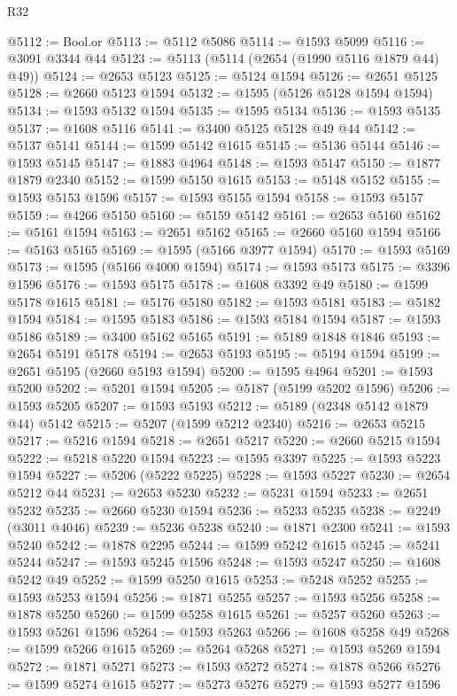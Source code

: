 \begin{lexlean}{R32}
\begin{coremodule}
@5112 := Bool.or
@5113 := @5112 @5086
@5114 := @1593 @5099
@5116 := @3091 @3344 @44
@5123 := @5113 (@5114 (@2654 (@1990 @5116 @1879 @44) @49))
@5124 := @2653 @5123
@5125 := @5124 @1594
@5126 := @2651 @5125
@5128 := @2660 @5123 @1594
@5132 := @1595 (@5126 @5128 @1594 @1594)
@5134 := @1593 @5132 @1594
@5135 := @1595 @5134
@5136 := @1593 @5135
@5137 := @1608 @5116
@5141 := @3400 @5125 @5128 @49 @44
@5142 := @5137 @5141
@5144 := @1599 @5142 @1615
@5145 := @5136 @5144
@5146 := @1593 @5145
@5147 := @1883 @4964
@5148 := @1593 @5147
@5150 := @1877 @1879 @2340
@5152 := @1599 @5150 @1615
@5153 := @5148 @5152
@5155 := @1593 @5153 @1596
@5157 := @1593 @5155 @1594
@5158 := @1593 @5157
@5159 := @4266 @5150
@5160 := @5159 @5142
@5161 := @2653 @5160
@5162 := @5161 @1594
@5163 := @2651 @5162
@5165 := @2660 @5160 @1594
@5166 := @5163 @5165
@5169 := @1595 (@5166 @3977 @1594)
@5170 := @1593 @5169
@5173 := @1595 (@5166 @4000 @1594)
@5174 := @1593 @5173
@5175 := @3396 @1596
@5176 := @1593 @5175
@5178 := @1608 @3392 @49
@5180 := @1599 @5178 @1615
@5181 := @5176 @5180
@5182 := @1593 @5181
@5183 := @5182 @1594
@5184 := @1595 @5183
@5186 := @1593 @5184 @1594
@5187 := @1593 @5186
@5189 := @3400 @5162 @5165
@5191 := @5189 @1848 @1846
@5193 := @2654 @5191 @5178
@5194 := @2653 @5193
@5195 := @5194 @1594
@5199 := @2651 @5195 (@2660 @5193 @1594)
@5200 := @1595 @4964
@5201 := @1593 @5200
@5202 := @5201 @1594
@5205 := @5187 (@5199 @5202 @1596)
@5206 := @1593 @5205
@5207 := @1593 @5193
@5212 := @5189 (@2348 @5142 @1879 @44) @5142
@5215 := @5207 (@1599 @5212 @2340)
@5216 := @2653 @5215
@5217 := @5216 @1594
@5218 := @2651 @5217
@5220 := @2660 @5215 @1594
@5222 := @5218 @5220 @1594
@5223 := @1595 @3397
@5225 := @1593 @5223 @1594
@5227 := @5206 (@5222 @5225)
@5228 := @1593 @5227
@5230 := @2654 @5212 @44
@5231 := @2653 @5230
@5232 := @5231 @1594
@5233 := @2651 @5232
@5235 := @2660 @5230 @1594
@5236 := @5233 @5235
@5238 := @2249 (@3011 @4046)
@5239 := @5236 @5238
@5240 := @1871 @2300
@5241 := @1593 @5240
@5242 := @1878 @2295
@5244 := @1599 @5242 @1615
@5245 := @5241 @5244
@5247 := @1593 @5245 @1596
@5248 := @1593 @5247
@5250 := @1608 @5242 @49
@5252 := @1599 @5250 @1615
@5253 := @5248 @5252
@5255 := @1593 @5253 @1594
@5256 := @1871 @5255
@5257 := @1593 @5256
@5258 := @1878 @5250
@5260 := @1599 @5258 @1615
@5261 := @5257 @5260
@5263 := @1593 @5261 @1596
@5264 := @1593 @5263
@5266 := @1608 @5258 @49
@5268 := @1599 @5266 @1615
@5269 := @5264 @5268
@5271 := @1593 @5269 @1594
@5272 := @1871 @5271
@5273 := @1593 @5272
@5274 := @1878 @5266
@5276 := @1599 @5274 @1615
@5277 := @5273 @5276
@5279 := @1593 @5277 @1596

\end{coremodule}
\end{lexlean}

